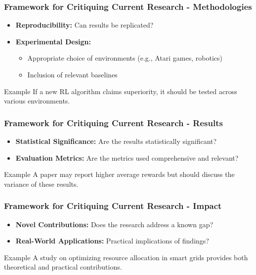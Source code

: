 \documentclass{beamer}
\begin{document}
\begin{frame}
    \frametitle{Framework for Critiquing Current Research - Methodologies}
    \begin{itemize}
        \item \textbf{Reproducibility:} Can results be replicated?
        \item \textbf{Experimental Design:}
        \begin{itemize}
            \item Appropriate choice of environments (e.g., Atari games, robotics)
            \item Inclusion of relevant baselines
        \end{itemize}
    \end{itemize}
    \begin{block}{Example}
        If a new RL algorithm claims superiority, it should be tested across various environments.
    \end{block}
\end{frame}

\begin{frame}
    \frametitle{Framework for Critiquing Current Research - Results}
    \begin{itemize}
        \item \textbf{Statistical Significance:} Are the results statistically significant?
        \item \textbf{Evaluation Metrics:} Are the metrics used comprehensive and relevant?
    \end{itemize}
    \begin{block}{Example}
        A paper may report higher average rewards but should discuss the variance of these results.
    \end{block}
\end{frame}

\begin{frame}
    \frametitle{Framework for Critiquing Current Research - Impact}
    \begin{itemize}
        \item \textbf{Novel Contributions:} Does the research address a known gap?
        \item \textbf{Real-World Applications:} Practical implications of findings?
    \end{itemize}
    \begin{block}{Example}
        A study on optimizing resource allocation in smart grids provides both theoretical and practical contributions.
    \end{block}
\end{frame}
\end{document}
